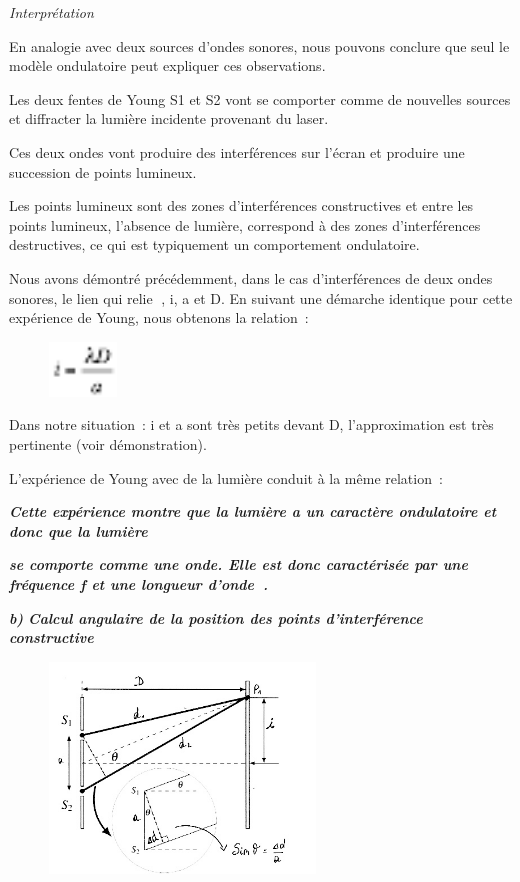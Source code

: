 \emph{Interprétation }

En analogie avec deux sources d'ondes sonores, nous pouvons conclure que
seul le modèle ondulatoire peut expliquer ces observations.

Les deux fentes de Young S1 et S2 vont se comporter comme de nouvelles
sources et diffracter la lumière incidente provenant du laser.

Ces deux ondes vont produire des interférences sur l'écran et produire
une succession de points lumineux.

Les points lumineux sont des zones d'interférences constructives et
entre les points lumineux, l'absence de lumière, correspond à des zones
d'interférences destructives, ce qui est typiquement un comportement
ondulatoire.

Nous avons démontré précédemment, dans le cas d'interférences de deux
ondes sonores, le lien qui relie , i, a et D. En suivant une démarche
identique pour cette expérience de Young, nous obtenons la relation~:

\begin{figure}
\centering
\includegraphics[width=1.788cm,height=1.46cm]{Pictures/100000010000001A00000015860A63C6525557ED.png}
\caption{}
\end{figure}

Dans notre situation~: i et a sont très petits devant D, l'approximation
est très pertinente (voir démonstration).

L'expérience de Young avec de la lumière conduit à la même relation~:

\emph{\textbf{Cette expérience montre que la lumière a un caractère
ondulatoire et donc que la lumière}}

\emph{\textbf{se comporte comme une onde. Elle est donc caractérisée par
une fréquence f et une longueur d'onde }\textbf{}\textbf{.}}

\emph{\textbf{b) }\textbf{Calcul angulaire de la position des points
d'interférence constructive}}

\begin{figure}
\centering
\includegraphics[width=7.071cm,height=5.604cm]{Pictures/10000001000001D8000001766572F750E44C7125.png}
\caption{}
\end{figure}

